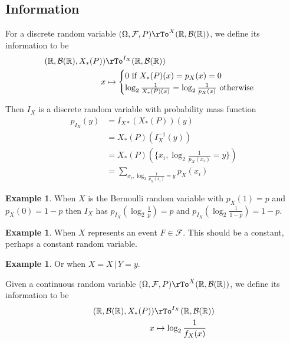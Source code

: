 \documentclass[12pt]{amsart}
\theoremstyle{definition}
\newtheorem{example}[theorem]{Example}
\begin{document}
\subsection{Information}
\dfn For a discrete random variable $(\Omega, \mathcal{F}, P) \rTo^X (\mathbb{R}, \mathcal{B}(\mathbb{R}))$, we define its information to be
\begin{align*}
(\mathbb{R}, \mathcal{B}(\mathbb{R}), X_*(P)) & \rTo^{I_X} (\mathbb{R}, \mathcal{B}(\mathbb{R})) \\
x & \mapsto \begin{cases} 0 \text{ if } X_*(P)(x) = p_X(x) = 0 \\ \log_2 \frac{1}{X_*(P)(x)} = \log_2 \frac{1}{p_X(x)} \text{ otherwise} \end{cases}
\end{align*}

Then $I_X$ is a discrete random variable with probability mass function
\begin{align*}
p_{I_X}(y) & = I_{X*}(X_*(P))(y) \\
 & = X_*(P)(I_X^{-1}(y)) \\
 & = X_*(P)( \{x_i, \log_2 \frac{1}{p_X(x_i)} = y\}) \\
 & = \sum\limits_{x_i, \log_2 \frac{1}{p_X(x_i)} = y} p_X(x_i)
\end{align*}

\begin{example} When $X$ is the Bernoulli random variable with $p_X(1) = p$ and $p_X(0) = 1 - p$ then $I_X$ has $p_{I_X}(\log_2 \frac{1}{p}) = p$ and $p_{I_X}(\log_2 \frac{1}{1 - p}) = 1 - p$.
\end{example}

\begin{example} When $X$ represents an event $F \in \mathcal{F}$. This should be a constant, perhaps a constant random variable.
\end{example}

\begin{example} Or when $X = X \,|\, Y = y$.
\end{example}

\dfn Given a continuous random variable $(\Omega, \mathcal{F}, P) \rTo^X (\mathbb{R}, \mathcal{B}(\mathbb{R}))$, we define its information to be
\begin{align*}
(\mathbb{R}, \mathcal{B}(\mathbb{R}), X_*(P)) & \rTo^{I_X} (\mathbb{R}, \mathcal{B}(\mathbb{R})) \\
x & \mapsto \log_2 \frac{1}{f_X(x)}
\end{align*}
\end{document}
